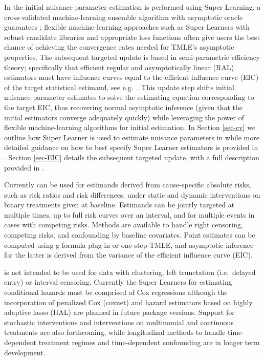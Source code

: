 In  the initial nuisance parameter estimation is performed using Super Learning, a cross-validated machine-learning ensemble algorithm with asymptotic oracle guarantees \citep{laan_unified_2003, laan_super_2007, polley_superlearner_2021}; flexible machine-learning approaches such as Super Learners with robust candidate libraries and appropriate loss functions often give users the best chance of achieving the convergence rates needed for TMLE's asymptotic properties. The subsequent targeted update is based in semi-parametric efficiency theory; specifically that efficient regular and asymptotically linear (RAL) estimators must have influence curves equal to the efficient influence curve (EIC) of the target statistical estimand, see e.g.~\citep{laan_targeted_2011}. This update step shifts initial nuisance parameter estimates to solve the estimating equation corresponding to the target EIC, thus recovering normal asymptotic inference (given that the initial estimators converge adequately quickly) while leveraging the power of flexible machine-learning algorithms for initial estimation. In Section \ref{sec-cv} we outline how Super Learner is used to estimate nuisance parameters in  while more detailed guidance on how to best specify Super Learner estimators is provided in \citep{phillips_practical_2022}. Section \ref{sec-EIC} details the subsequent targeted update, with a full description provided in \citep{rytgaard_one-step_2021}.

Currently  can be used for estimands derived from cause-specific absolute risks, such as risk ratios and risk differences, under static and dynamic interventions on binary treatments given at baseline. Estimands can be jointly targeted at multiple times, up to full risk curves over an interval, and for multiple events in cases with competing risks. Methods are available to handle right censoring, competing risks, and confounding by baseline covariates. Point estimates can be computed using g-formula plug-in or one-step TMLE, and asymptotic inference for the latter is derived from the variance of the efficient influence curve (EIC).

 is not intended to be used for data with clustering, left trunctation (i.e.~delayed entry) or interval censoring. Currently the Super Learners for estimating conditional hazards must be comprised of Cox regressions although the incorporation of penalized Cox (coxnet) and hazard estimators based on highly adaptive lasso (HAL) are planned in future package versions. Support for stochastic interventions and interventions on multinomial and continuous treatments are also forthcoming, while longitudinal methods to handle time-dependent treatment regimes and time-dependent confounding are in longer term development.

